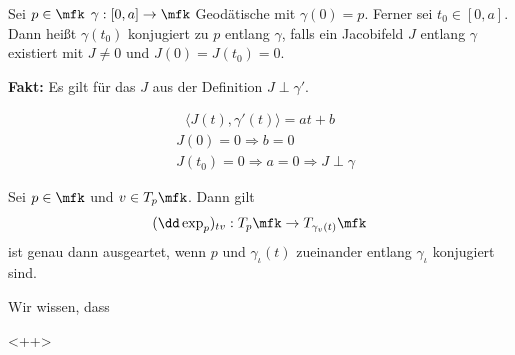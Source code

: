 \begin{defs}
Sei $p\in\mfk$ $\gamma : [ 0,a] \to\mfk$ Geodätische mit $\gamma (0) = p$.
Ferner sei $t_0\in [0,a]$.
Dann heißt $\gamma (t_0)$ konjugiert zu $p$ entlang $\gamma$,
falls ein Jacobifeld $J$ entlang $\gamma$ existiert mit 
$J\neq 0$ und $J(0) = J(t_0)=0$.
\end{defs}
\textbf{Fakt:}
Es gilt für das $J$ aus der Definition $J \perp \gamma'$.

\begin{bew}
\begin{align*}
    \langle J(t) , \gamma'(t) \rangle = at + b
\end{align*}
\begin{align*}
    &J(0)=0 \Rightarrow b=0\\
    &J(t_0) = 0 \Rightarrow a = 0 \Rightarrow J \perp \gamma
\end{align*}

\end{bew}


\begin{lem}
    Sei $p\in\mfk$ und $v\in T_p\mfk$.
    Dann gilt
    \begin{align*}
        (\dd \exp_p)_{tv}: T_p\mfk \to T_{\gamma_v (t)} \mfk
    \end{align*}
    ist genau dann ausgeartet, wenn $p$ und $\gamma_\iota (t)$
    zueinander entlang $\gamma_\iota$ konjugiert sind.
\end{lem}

\begin{bew}
Wir wissen, dass 
\end{bew}<++>














